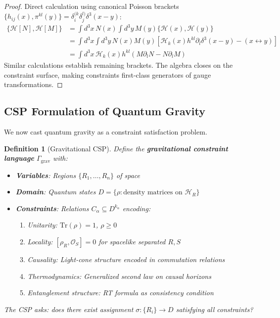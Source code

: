 \documentclass[11pt,a4paper]{article}
\newtheorem{definition}{Definition}[section]
\theoremstyle{remark}
\theoremstyle{definition}
\begin{document}
\begin{proof}
Direct calculation using canonical Poisson brackets $\{h_{ij}(x), \pi^{kl}(y)\} = \delta^{(k}_i \delta^{l)}_{j} \delta^3(x-y)$:
\begin{align}
\{\mathcal{H}[N], \mathcal{H}[M]\} &= \int d^3x \, N(x) \int d^3y \, M(y) \{\mathcal{H}(x), \mathcal{H}(y)\} \\
&= \int d^3x \int d^3y \, N(x) M(y) \left[\mathcal{H}_k(x) h^{kl} \partial_l \delta^3(x-y) - (x \leftrightarrow y)\right] \\
&= \int d^3x \, \mathcal{H}_k(x) h^{kl}(M \partial_l N - N \partial_l M)
\end{align}
Similar calculations establish remaining brackets. The algebra closes on the constraint surface, making constraints first-class generators of gauge transformations.
\end{proof}

\subsection{CSP Formulation of Quantum Gravity}

We now cast quantum gravity as a constraint satisfaction problem.

\begin{definition}[Gravitational CSP]
Define the \textbf{gravitational constraint language} $\Gamma_{\text{grav}}$ with:
\begin{itemize}
\item \textbf{Variables}: Regions $\{R_1, \ldots, R_n\}$ of space
\item \textbf{Domain}: Quantum states $D = \{\rho : \text{density matrices on } \mathcal{H}_R\}$
\item \textbf{Constraints}: Relations $C_\alpha \subseteq D^{k_\alpha}$ encoding:
\begin{enumerate}[label=(\roman*)]
\item Unitarity: $\text{Tr}(\rho) = 1$, $\rho \geq 0$
\item Locality: $[\rho_R, \mathcal{O}_S] = 0$ for spacelike separated $R, S$
\item Causality: Light-cone structure encoded in commutation relations
\item Thermodynamics: Generalized second law on causal horizons
\item Entanglement structure: RT formula as consistency condition
\end{enumerate}
\end{itemize}
The CSP asks: does there exist assignment $\sigma: \{R_i\} \to D$ satisfying all constraints?
\end{definition}
\end{document}

